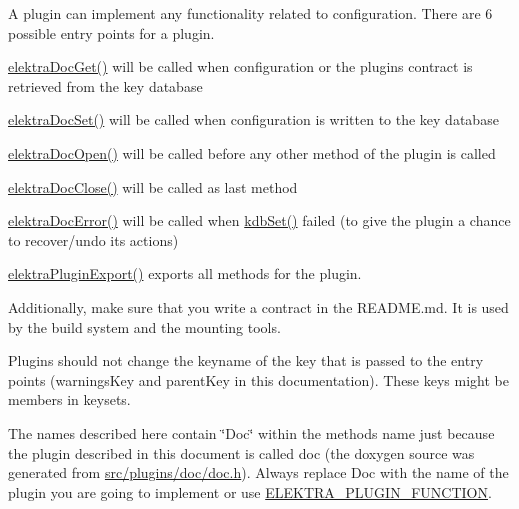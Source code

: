 A plugin can implement any functionality related to configuration. There are 6 possible entry points for a plugin.
\begin{DoxyItemize}
\item \hyperlink{group__plugin_gacb69f3441c6d84241b4362f958fbe313}{elektra\+Doc\+Get()} will be called when configuration or the plugin\textquotesingle{}s contract is retrieved from the key database
\item \hyperlink{group__plugin_gae65781a1deb34efc79c8cb9d9174842c}{elektra\+Doc\+Set()} will be called when configuration is written to the key database
\item \hyperlink{group__plugin_ga23c2eb3584e38a4d494eb8f91e5e3d8d}{elektra\+Doc\+Open()} will be called before any other method of the plugin is called
\item \hyperlink{group__plugin_ga1236aefe5b2baf8b7bf636ba5aa9ea29}{elektra\+Doc\+Close()} will be called as last method
\item \hyperlink{group__plugin_gad74b35f558ac7c3262f6069c5c47dc79}{elektra\+Doc\+Error()} will be called when \hyperlink{group__kdb_ga11436b058408f83d303ca5e996832bcf}{kdb\+Set()} failed (to give the plugin a chance to recover/undo its actions)
\item \hyperlink{group__plugin_ga8dd092048e972a3f0c9c9f54eb41576e}{elektra\+Plugin\+Export()} exports all methods for the plugin.
\end{DoxyItemize}

Additionally, make sure that you write a contract in the R\+E\+A\+D\+M\+E.\+md. It is used by the build system and the mounting tools.

Plugins should not change the keyname of the key that is passed to the entry points (warnings\+Key and parent\+Key in this documentation). These keys might be members in keysets.

The names described here contain \char`\"{}\+Doc\char`\"{} within the method\textquotesingle{}s name just because the plugin described in this document is called doc (the doxygen source was generated from \hyperlink{doc_8h}{src/plugins/doc/doc.\+h}). Always replace Doc with the name of the plugin you are going to implement or use \hyperlink{group__plugin_ga34d1a66f0a6e89cfd20f4014a9975a2a}{E\+L\+E\+K\+T\+R\+A\+\_\+\+P\+L\+U\+G\+I\+N\+\_\+\+F\+U\+N\+C\+T\+I\+ON}.

